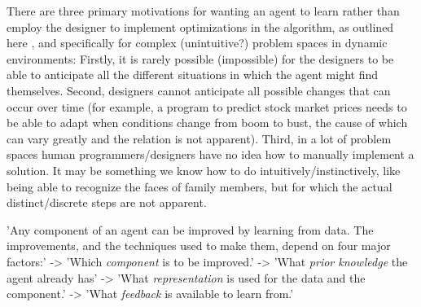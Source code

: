 

There are three primary motivations for wanting an agent to learn rather than employ the designer to implement optimizations in the algorithm, as outlined here \cite{russell2016artificial}, and specifically for complex (unintuitive?) problem spaces in dynamic environments:
Firstly, it is rarely possible (impossible) for the designers to be able to anticipate all the different situations in which the agent might find themselves.
Second, designers cannot anticipate all possible changes that can occur over time (for example, a program to predict stock market prices needs to be able to adapt when conditions change from boom to bust, the cause of which can vary greatly and the relation is not apparent).
Third, in a lot of problem spaces human programmers/designers have no idea how to manually implement a solution. It may be something we know how to do intuitively/instinctively, like being able to recognize the faces of family members, but for which the actual distinct/discrete steps are not apparent.



'Any component of an agent can be improved by learning from data. The improvements, and the techniques used to make them, depend on four major factors:'
-> 'Which \textit{component} is to be improved.'
-> 'What \textit{prior knowledge} the agent already has'
-> 'What \textit{representation} is used for the data and the component.'
-> 'What \textit{feedback} is available to learn from.'

